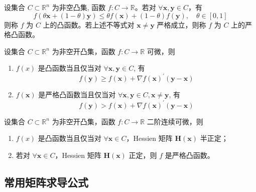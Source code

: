 \documentclass[cn]{elegantpaper}
\begin{document}
\begin{definition}[凸函数]
    设集合 $C\subset\mathbb{R}^{n}$ 为非空凸集, 函数 $f:C\rightarrow\mathbb{R}$。若对 $\forall\mathbf{x},\mathbf{y}\in C$，有
    \begin{equation}
        f(\theta\mathbf{x}+(1-\theta)\mathbf{y})\leq\theta f(\mathbf{x})+(1-\theta)f(\mathbf{y}),\quad\theta\in[0,1]
    \end{equation}
    则称 $f$ 为 $C$ 上的凸函数。若上述不等式对 $\mathbf{x}\neq\mathbf{y}$ 严格成立，则称 $f$ 为 $C$ 上的严格凸函数。
\end{definition}

\begin{theorem}[凸函数的一阶判定条件]
    设集合 $C\subset\mathbb{R}^{n}$ 为非空开凸集，函数 $f:C\rightarrow\mathbb{R}$ 可微，则
    \begin{enumerate}
        \item $f(x)$ 是凸函数当且仅当对 $\forall\mathbf{x},\mathbf{y}\in C$, 有
              \begin{equation}
                  f(\mathbf{y})\geq f(\mathbf{x})+\nabla f(\mathbf{x})^{\prime}(\mathbf{y}-\mathbf{x})
              \end{equation}
        \item $f(\mathbf{x})$ 是严格凸函数当且仅当对 $\forall\mathbf{x},\mathbf{y}\in C,\mathbf{x}\neq\mathbf{y}$, 有
              \begin{equation}
                  f(\mathbf{y})>f(\mathbf{x})+\nabla f(\mathbf{x})^{\prime}(\mathbf{y}-\mathbf{x})
              \end{equation}
    \end{enumerate}
\end{theorem}

\begin{theorem}[凸函数的二阶判定条件]
    设集合 $C\subset\mathbb{R}^{n}$ 为非空开凸集，函数 $f:C\rightarrow\mathbb{R}$ 二阶连续可微，则
    \begin{enumerate}
        \item $f(x)$ 是凸函数当且仅当对 $\forall\mathbf{x}\in C$，Hessien 矩阵 $\boldsymbol{H}(\mathbf{x})$ 半正定；
        \item 若对 $\forall\mathbf{x}\in C$，Hessien 矩阵 $\boldsymbol{H}(\mathbf{x})$ 正定，则 $f$ 是严格凸函数。
    \end{enumerate}
\end{theorem}

\subsection{常用矩阵求导公式}
\end{document}
